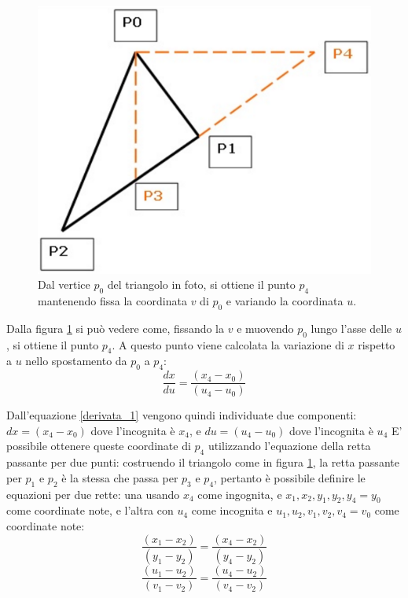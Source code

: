 \begin{figure}[htb]
 \centering
 \includegraphics[width=0.5\linewidth]{images/chapter_stato_arte/stato_arte_ligh_triangle2.png}\hfill
 \caption[Triangolo di esempio per calcolo coordinate]{Dal vertice $p_0$ del triangolo in foto, si ottiene il punto $p_4$ mantenendo fissa la coordinata $v$ di $p_0$ e variando la coordinata $u$.}
 \label{fig:stato_arte_ligh_triangle2}
\end{figure}

Dalla figura \ref{fig:stato_arte_ligh_triangle2} si può vedere come, fissando la $v$ e muovendo $p_0$ lungo l’asse delle $u$, si ottiene il punto $p_4$. A questo punto viene calcolata la variazione di $x$ rispetto a $u$ nello spostamento da $p_0$ a $p_4$:
\begin{equation}
\frac{dx}{du} = \frac{(x_4 - x_0)}{(u_4 - u_0)} 
\label{derivata_1}
\end{equation}

Dall'equazione \ref{derivata_1} vengono quindi individuate due componenti: $dx = (x_4-x_0)$ dove l’incognita è $x_4$, e $du = (u_4-u_0)$ dove l’incognita è $u_4$ E’ possibile ottenere queste coordinate di $p_4$ utilizzando l’equazione della retta passante per due punti: costruendo il triangolo come in figura \ref{fig:stato_arte_ligh_triangle2}, la retta passante per $p_1$ e $p_2$ è la stessa che passa per $p_3$ e $p_4$, pertanto è possibile definire le equazioni per due rette: una usando $x_4$ come ingognita, e $x_1,x_2,y_1,y_2,y_4=y_0$ come coordinate note, e l’altra con $u_4$ come incognita e $u_1,u_2,v_1,v_2,v_4=v_0$ come coordinate note:
\begin{equation}
\frac{(x_1 - x_2)}{(y_1 - y_2)} = \frac{(x_4 - x_2)}{(y_4 - y_2)} 
\label{eq_retta1}
\end{equation}
\begin{equation}
\frac{(u_1 - u_2)}{(v_1 - v_2)} = \frac{(u_4 - u_2)}{(v_4 - v_2)} 
\label{eq_retta2}
\end{equation}


